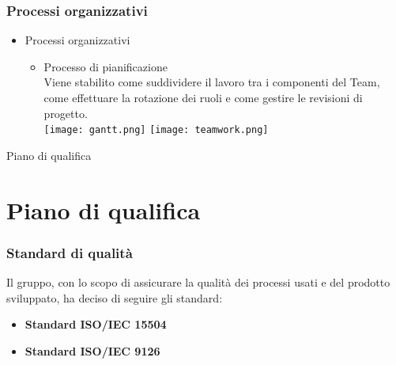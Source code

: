 \begin{frame}
  \frametitle{Processi organizzativi}
  \begin{itemize}
  \item Processi organizzativi
    \begin{itemize}
    \item Processo di pianificazione\\
      Viene stabilito come suddividere il lavoro tra i componenti del Team, come effettuare la rotazione dei ruoli e come gestire le revisioni di progetto.\\
      \texttt{[image: gantt.png]}
      \texttt{[image: teamwork.png]}
    \end{itemize}
  \end{itemize}
\end{frame}

\begin{frame}

\begin{center}   \huge Piano di qualifica \end{center}

\end{frame}

\section{Piano di qualifica}
\begin{frame}
  \frametitle{Standard di qualità}
  Il gruppo, con lo scopo di assicurare la qualità dei processi usati e del prodotto sviluppato, ha deciso di seguire gli standard:
	\begin{itemize}
  	\item \textbf{Standard ISO/IEC 15504}
  	\item \textbf{Standard ISO/IEC 9126}
	\end{itemize}
\end{frame}


